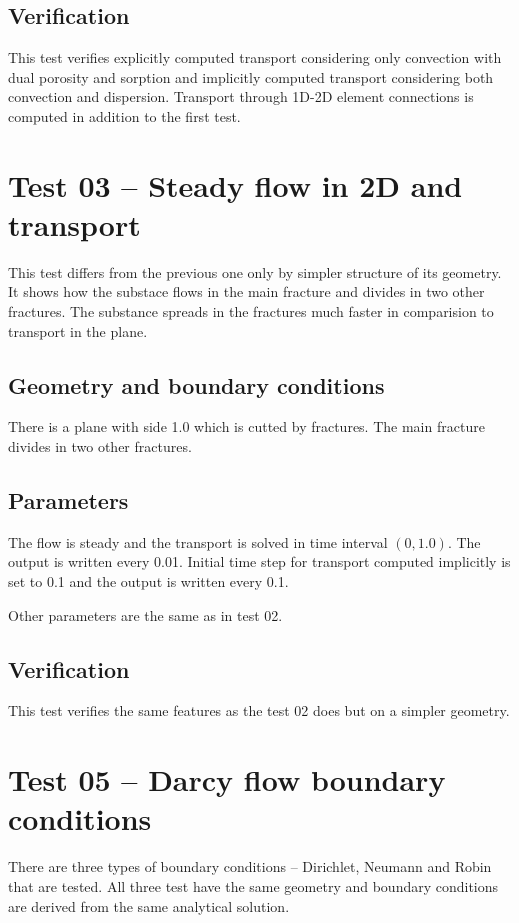 \subsection*{Verification}
This test verifies explicitly computed transport considering only convection with dual porosity and sorption and implicitly 
computed transport considering both convection and dispersion. Transport through 1D-2D element connections is computed in addition to the first test.




\section{Test 03 -- Steady flow in 2D and transport}
\label{sec:test03}
This test differs from the previous one only by simpler structure of its geometry. It shows how the substace flows in the main fracture and divides in two other fractures. The substance spreads in the fractures much faster in comparision to transport in the plane.
\subsection*{Geometry and boundary conditions}
There is a plane with side 1.0 which is cutted by fractures. The main fracture divides in two other fractures.
\subsection*{Parameters}
The flow is steady and the transport is solved in time interval $(0,1.0)$. The output is written every 0.01. Initial time step for transport computed implicitly is set to 0.1 and the output is written every 0.1.

Other parameters are the same as in test 02.
\subsection*{Verification}
This test verifies the same features as the test 02 does but on a simpler geometry.




\section{Test 05 -- Darcy flow boundary conditions}
\label{sec:test05}
There are three types of boundary conditions -- Dirichlet, Neumann and Robin that are tested. All three test have the same geometry and boundary conditions are derived from the same analytical solution.

